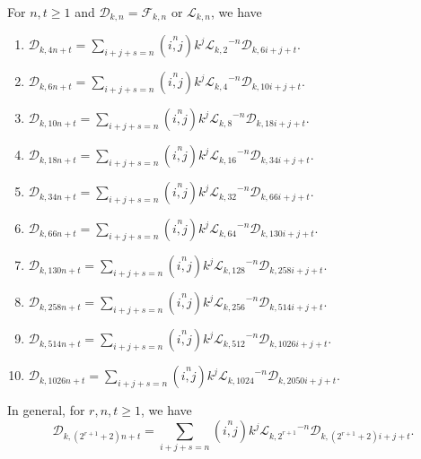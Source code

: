 \begin{theorem}For $n, t\geq 1$ and $\mathcal{D}_{k,n}=\mathcal{F}_{k,n}$ or $\mathcal{L}_{k,n}$, we have\label{3.8}
\begin{enumerate}
\item $\mathcal{D}_{k,4n+t}=\sum\limits_{i+j+s=n}\left( \stackrel{n}{i,j}\right) k^{j}{\mathcal{L}_{k,2}}^{-n}\mathcal{D}_{k,6i+j+t} $.
\item $\mathcal{D}_{k,6n+t}=\sum\limits_{i+j+s=n}\left( \stackrel{n}{i,j}\right) k^{j}{\mathcal{L}_{k,4}}^{-n}\mathcal{D}_{k,10i+j+t} $.
\item $\mathcal{D}_{k,10n+t}=\sum\limits_{i+j+s=n}\left( \stackrel{n}{i,j}\right) k^{j}{\mathcal{L}_{k,8}}^{-n}\mathcal{D}_{k,18i+j+t} $.
\item $\mathcal{D}_{k,18n+t}=\sum\limits_{i+j+s=n}\left( \stackrel{n}{i,j}\right) k^{j}{\mathcal{L}_{k,16}}^{-n}\mathcal{D}_{k,34i+j+t} $.
\item $\mathcal{D}_{k,34n+t}=\sum\limits_{i+j+s=n}\left( \stackrel{n}{i,j}\right) k^{j}{\mathcal{L}_{k,32}}^{-n}\mathcal{D}_{k,66i+j+t} $.
\item $\mathcal{D}_{k,66n+t}=\sum\limits_{i+j+s=n}\left( \stackrel{n}{i,j}\right) k^{j}{\mathcal{L}_{k,64}}^{-n}\mathcal{D}_{k,130i+j+t} $.
\item $\mathcal{D}_{k,130n+t}=\sum\limits_{i+j+s=n}\left( \stackrel{n}{i,j}\right) k^{j}{\mathcal{L}_{k,128}}^{-n}\mathcal{D}_{k,258i+j+t} $.
\item $\mathcal{D}_{k,258n+t}=\sum\limits_{i+j+s=n}\left( \stackrel{n}{i,j}\right) k^{j}{\mathcal{L}_{k,256}}^{-n}\mathcal{D}_{k,514i+j+t} $.
\item $\mathcal{D}_{k,514n+t}=\sum\limits_{i+j+s=n}\left( \stackrel{n}{i,j}\right) k^{j}{\mathcal{L}_{k,512}}^{-n}\mathcal{D}_{k,1026i+j+t} $.
\item $\mathcal{D}_{k,1026n+t}=\sum\limits_{i+j+s=n}\left( \stackrel{n}{i,j}\right) k^{j}{\mathcal{L}_{k,1024}}^{-n}\mathcal{D}_{k,2050i+j+t} $.
\end{enumerate}
In general, for $r, n,t\geq 1$, we have
$$\mathcal{D}_{k,(2^{r+1}+2)n+t}=\sum\limits_{i+j+s=n}\left( \stackrel{n}{i,j}\right) k^{j}{\mathcal{L}_{k,2^{r+1}}}^{-n}\mathcal{D}_{k,(2^{r+1}+2)i+j+t}. $$
\end{theorem}
